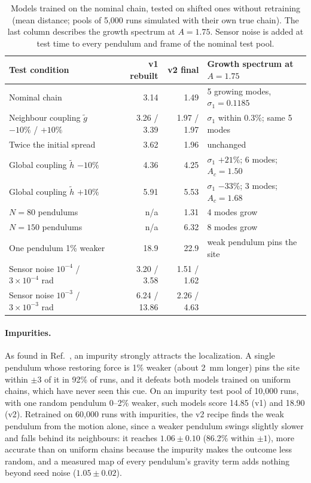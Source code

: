 \documentclass[11pt]{article}
\newcommand{\gt}{\tilde g}
\newcommand{\htl}{\tilde h}
\begin{document}
\begin{table}[htbp]
  \centering
  \caption{Models trained on the nominal chain, tested on shifted ones without retraining (mean distance; pools of 5,000 runs simulated with their own true chain). The last column describes the growth spectrum at $A=1.75$. Sensor noise is added at test time to every pendulum and frame of the nominal test pool.}
  \label{tab:robust}
  \small
  \begin{tabular}{@{}lrrl@{}}
    \toprule
    Test condition & v1 rebuilt & v2 final & Growth spectrum at $A=1.75$ \\
    \midrule
    Nominal chain & 3.14 & 1.49 & 5 growing modes, $\sigma_1=0.1185$ \\
    Neighbour coupling $\gt$ $-10\%$ / $+10\%$ & 3.26 / 3.39 & 1.97 / 1.97 & $\sigma_1$ within 0.3\%; same 5 modes \\
    Twice the initial spread & 3.62 & 1.96 & unchanged \\
    Global coupling $\htl$ $-10\%$ & 4.36 & 4.25 & $\sigma_1$ $+21\%$; 6 modes; $A_c=1.50$ \\
    Global coupling $\htl$ $+10\%$ & 5.91 & 5.53 & $\sigma_1$ $-33\%$; 3 modes; $A_c=1.68$ \\
    $N=80$ pendulums & n/a & 1.31 & 4 modes grow \\
    $N=150$ pendulums & n/a & 6.32 & 8 modes grow \\
    One pendulum 1\% weaker & 18.9 & 22.9 & weak pendulum pins the site \\
    \midrule
    Sensor noise $10^{-4}$ / $3\times10^{-4}$ rad & 3.20 / 3.58 & 1.51 / 1.62 & \\
    Sensor noise $10^{-3}$ / $3\times10^{-3}$ rad & 6.24 / 13.86 & 2.26 / 4.63 & \\
    \bottomrule
  \end{tabular}
\end{table}

\paragraph{Impurities.} As found in Ref.~\cite{mittal2026jand}, an impurity strongly attracts the localization. A single pendulum whose restoring force is 1\% weaker (about 2~mm longer) pins the site within $\pm3$ of it in 92\% of runs, and it defeats both models trained on uniform chains, which have never seen this cue. On an impurity test pool of 10,000 runs, with one random pendulum 0--2\% weaker, such models score 14.85 (v1) and 18.90 (v2). Retrained on 60,000 runs with impurities, the v2 recipe finds the weak pendulum from the motion alone, since a weaker pendulum swings slightly slower and falls behind its neighbours: it reaches $1.06\pm0.10$ (86.2\% within $\pm1$), more accurate than on uniform chains because the impurity makes the outcome less random, and a measured map of every pendulum's gravity term adds nothing beyond seed noise ($1.05\pm0.02$).
\end{document}
